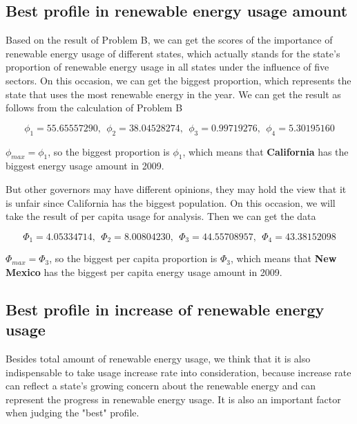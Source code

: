 \documentclass[a4paper,11pt]{article}
\begin{document}
\subsection{Best profile in renewable energy usage amount}

\par Based on the result of Problem B, we can get the scores of the importance of renewable energy usage of different states, which actually stands for the state's proportion of renewable energy usage in all states under the influence of five sectors. On this occasion, we can get the biggest proportion, which represents the state that uses the most renewable energy in the year. We can get the result as follows from the calculation of Problem B

\begin{equation}
    \phi_{1} = 55.65557290,~~ \phi_{2} = 38.04528274,~~ \phi_{3} = 0.99719276,~~ \phi_{4} = 5.30195160
\end{equation}

\par $\phi_{max} = \phi_{1}$, so the biggest proportion is $\phi_{1}$, which means that \textbf{California} has the biggest energy usage amount in 2009.

\par But other governors may have different opinions, they may hold the view that it is unfair since California has the biggest population. On this occasion, we will take the result of per capita usage for analysis. Then we can get the data

\begin{equation}
    \Phi_{1} = 4.05334714,~~ \Phi_{2} = 8.00804230,~~ \Phi_{3} = 44.55708957,~~ \Phi_{4} = 43.38152098
\end{equation}
\par $\Phi_{max} = \Phi_{3}$, so the biggest per capita proportion is $\Phi_{3}$, which means that \textbf{New Mexico} has the biggest per capita energy usage amount in 2009.

\subsection{Best profile in increase of renewable energy usage}

\par Besides total amount of renewable energy usage, we think that it is also indispensable to take usage increase rate into consideration, because increase rate can reflect a state's growing concern about the renewable energy and can represent the progress in renewable energy usage. It is also an important factor when judging the "best" profile.
\end{document}
